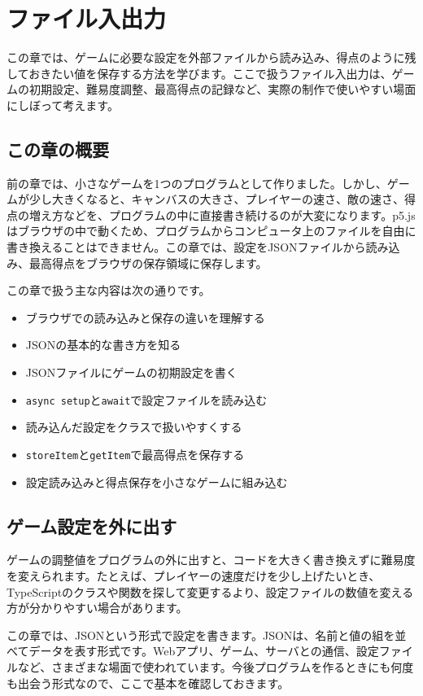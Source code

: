 \chapter{ファイル入出力}
\label{chap:file-io}

この章では、ゲームに必要な設定を外部ファイルから読み込み、得点のように残しておきたい値を保存する方法を学びます。ここで扱うファイル入出力は、ゲームの初期設定、難易度調整、最高得点の記録など、実際の制作で使いやすい場面にしぼって考えます。

\section{この章の概要}

前の章では、小さなゲームを1つのプログラムとして作りました。しかし、ゲームが少し大きくなると、キャンバスの大きさ、プレイヤーの速さ、敵の速さ、得点の増え方などを、プログラムの中に直接書き続けるのが大変になります。p5.jsはブラウザの中で動くため、プログラムからコンピュータ上のファイルを自由に書き換えることはできません。この章では、設定をJSONファイルから読み込み、最高得点をブラウザの保存領域に保存します。

この章で扱う主な内容は次の通りです。

\begin{itemize}
    \item ブラウザでの読み込みと保存の違いを理解する
    \item JSONの基本的な書き方を知る
    \item JSONファイルにゲームの初期設定を書く
    \item \texttt{async setup}と\texttt{await}で設定ファイルを読み込む
    \item 読み込んだ設定をクラスで扱いやすくする
    \item \texttt{storeItem}と\texttt{getItem}で最高得点を保存する
    \item 設定読み込みと得点保存を小さなゲームに組み込む
\end{itemize}

\section{ゲーム設定を外に出す}

ゲームの調整値をプログラムの外に出すと、コードを大きく書き換えずに難易度を変えられます。たとえば、プレイヤーの速度だけを少し上げたいとき、TypeScriptのクラスや関数を探して変更するより、設定ファイルの数値を変える方が分かりやすい場合があります。

この章では、JSONという形式で設定を書きます。JSONは、名前と値の組を並べてデータを表す形式です。Webアプリ、ゲーム、サーバとの通信、設定ファイルなど、さまざまな場面で使われています。今後プログラムを作るときにも何度も出会う形式なので、ここで基本を確認しておきます。

